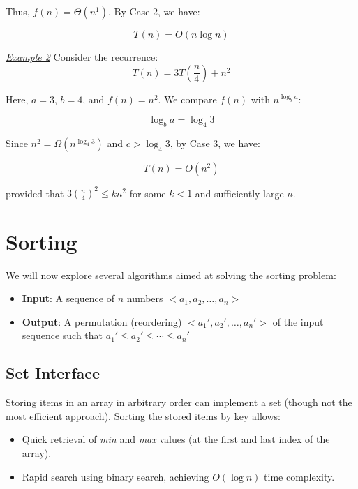 \documentclass[a4paper,10pt]{article}
\begin{document}
Thus, \(f(n) = \Theta(n^1)\). By Case 2, we have:

\begin{equation}
    T(n) = O(n \log{n})
\end{equation}

\noindent
\textit{\underline{Example 2}}
Consider the recurrence:
\begin{equation}
    T(n) = 3T\left(\frac{n}{4}\right) + n^2
\end{equation}

Here, \(a = 3\), \(b = 4\), and \(f(n) = n^2\). We compare \(f(n)\) with \(n^{\log_b{a}}\):

\begin{equation}
    \log_b{a} = \log_4{3}
\end{equation}

Since \(n^2 = \Omega(n^{\log_4{3}})\) and \(c > \log_4{3}\), by Case 3, we have:

\begin{equation}
    T(n) = O(n^2)
\end{equation}

provided that \(3\left(\frac{n}{4}\right)^2 \leq k n^2\) for some \(k < 1\) and sufficiently large \(n\).


\section{Sorting}

We will now explore several algorithms aimed at solving the sorting problem:

\begin{itemize}
    \item \textbf{Input}: A sequence of \( n \) numbers \( < a_1, a_2, \ldots, a_n > \)
    \item \textbf{Output}: A permutation (reordering) \( < a_1', a_2', \ldots, a_n' > \) of the input sequence such that \( a_1' \leq a_2' \leq \cdots \leq a_n' \)
\end{itemize}

\subsection{Set Interface}

Storing items in an array in arbitrary order can implement a set (though not the most efficient approach). Sorting the stored items by key allows:

\begin{itemize}
    \item Quick retrieval of \textit{min} and \textit{max} values (at the first and last index of the array).
    \item Rapid search using binary search, achieving \( O(\log n) \) time complexity.
\end{itemize}
\end{document}
